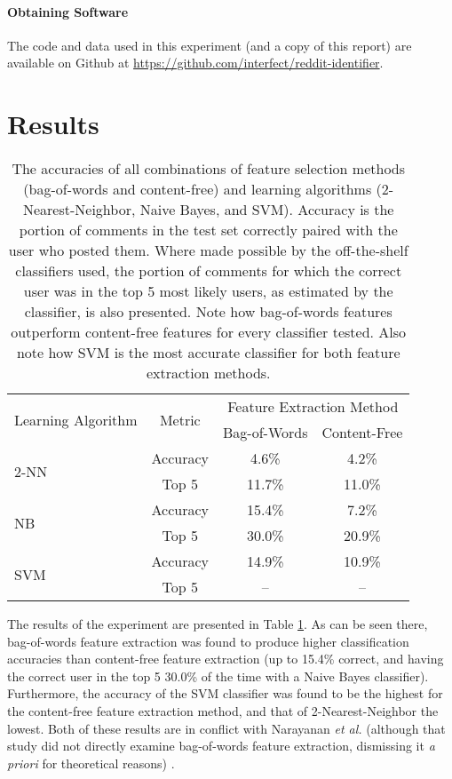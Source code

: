 \documentclass[12pt]{article}
\begin{document}
\paragraph{Obtaining Software} The code and data used in this experiment (and a copy of this report) are available on Github at \url{https://github.com/interfect/reddit-identifier}.

\section{Results}

\begin{table}
\begin{center}
\begin{tabular}{|l|c|c|c|}
\hline \multirow{2}{*}{Learning Algorithm} & \multirow{2}{*}{Metric} & \multicolumn{2}{|c|}{Feature Extraction Method} \\
\hhline{~~--}
 & & Bag-of-Words & Content-Free \\
\hline \multirow{2}{*}{2-NN} & Accuracy & 4.6\% & 4.2\% \\
\hhline{~---}
 & Top 5 & 11.7\% & 11.0\% \\
\hline \multirow{2}{*}{NB} & Accuracy & 15.4\% & 7.2\% \\
\hhline{~---}
 & Top 5 & 30.0\% & 20.9\% \\
\hline \multirow{2}{*}{SVM} & Accuracy & 14.9\% & 10.9\% \\
\hhline{~---}
 & Top 5 & -- & -- \\
\hline
\end{tabular}
\end{center}
\caption{\label{tbl:results}
The accuracies of all combinations of feature selection methods (bag-of-words and content-free) and learning algorithms (2-Nearest-Neighbor, Naive Bayes, and SVM). Accuracy is the portion of comments in the test set correctly paired with the user who posted them. Where made possible by the off-the-shelf classifiers used, the portion of comments for which the correct user was in the top 5 most likely users, as estimated by the classifier, is also presented. Note how bag-of-words features outperform content-free features for every classifier tested. Also note how SVM is the most accurate classifier for both feature extraction methods.
}
\end{table}

The results of the experiment are presented in Table \ref{tbl:results}. As can be seen there, bag-of-words feature extraction was found to produce higher classification accuracies than content-free feature extraction (up to 15.4\% correct, and having the correct user in the top 5 30.0\% of the time with a Naive Bayes classifier). Furthermore, the accuracy of the SVM classifier was found to be the highest for the content-free feature extraction method, and that of 2-Nearest-Neighbor the lowest. Both of these results are in conflict with Narayanan \textit{et al.} (although that study did not directly examine bag-of-words feature extraction, dismissing it \textit{a priori} for theoretical reasons) \cite{narayanan2012feasibility}.
\end{document}

